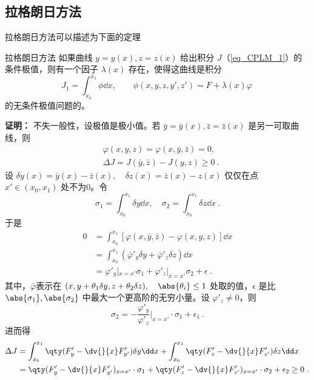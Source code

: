 \subsection{拉格朗日方法}
拉格朗日方法可以描述为下面的定理
\begin{theorem}{拉格朗日方法}
如果曲线 $y=y(x),z=z(x)$ 给出积分 $J$（\autoref{eq_CPLM_1}）的条件极值，则有一个因子 $\lambda(x)$ 存在，使得这曲线是积分
\begin{equation}\label{eq_CPLM_4}
J_1=\int_{x_0}^{x_1}\phi \dd x,\qquad \phi(x,y,z,y',z')=F+\lambda(x)\varphi~
\end{equation}
的无条件极值问题的。
\end{theorem}
\textbf{证明：}
不失一般性，设极值是极小值。若 $\bar y=\bar y(x),\bar z=\bar z(x)$ 是另一可取曲线，则
\begin{equation}
\begin{aligned}
&\varphi(x,y,z)=\varphi(x,\bar y,\bar z)=0,\\
&\Delta J=J(\bar y,\bar z)-J(y,z)\geq0~.
\end{aligned}
\end{equation}
设 $\delta y(x)=\bar y(x)-\bar z(x),\quad\delta z(x)=\bar z(x)-z(x)$ 仅仅在点 $x'\in (x_0,x_1)$ 处不为0。令
\begin{equation}
\sigma_1=\int_{x_0}^{x_1}\delta y\dd x,\quad \sigma_2=\int_{x_0}^{x_1}\delta z\dd x~.
\end{equation}
于是
\begin{equation}
\begin{aligned}
0&=\int_{x_0}^{x_1}[\varphi(x,\bar y,\bar z)-\varphi(x,y,z)]\dd x\\
&=\int_{x_0}^{x_1}(\bar\varphi'_y\delta y+\bar\varphi'_z\delta z)\dd x\\
&=\varphi'_y|_{x=x'}\sigma_1+\varphi'_z|_{x=x'}\sigma_2+\epsilon~.
\end{aligned}
\end{equation}
其中，$\bar\varphi$表示在 $(x,y+\theta_1\delta y,z+\theta_2\delta z),\quad \abs{\theta_i}\leq 1$ 处取的值，$\epsilon$ 是比 $\abs{\sigma_1},\abs{\sigma_2}$ 中最大一个更高阶的无穷小量。设 $\varphi'_z\neq0$，则
\begin{equation}\label{eq_CPLM_2}
\sigma_2=-\frac{\varphi'_y}{\varphi'_z}\Big|_{x=x'}\cdot\sigma_1+\epsilon_1~.
\end{equation}
进而得
\begin{equation}\label{eq_CPLM_3}
\begin{aligned}
\Delta J&=\int_{x_0}^{x_1}\qty(F'_y-\dv{}{x}F'_{y'})\delta y\dd x+\int_{x_0}^{x_1}\qty(F'_z-\dv{}{x}F'_{z'})\delta z\dd x\\
&=\qty(F'_y-\dv{}{x}F'_{y'})_{x=x'}\cdot\sigma_1+\qty(F'_z-\dv{}{x}F'_{z'})_{x=x'}\cdot\sigma_2+\epsilon_2\geq0~.
\end{aligned}
\end{equation}
